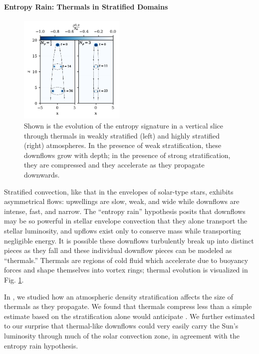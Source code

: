 \documentclass[preprint, hmargin=1in, vmargin=1in]{aastex62}
\begin{document}
\paragraph{Entropy Rain: Thermals in Stratified Domains}
\begin{figure}
	\begin{center}
	\vspace{-37pt}
    \includegraphics[width=0.45\textwidth]{./figs/evolution_colormeshes.pdf}
	\vspace{-16pt}
	\end{center}
    \caption{
	\citep[Fig.~2 of][]{andersLB2019} Shown is the evolution of the entropy signature in a vertical slice through thermals in weakly stratified (left) and highly stratified (right) atmospheres.
	In the presence of weak stratification, these downflows grow with depth; in the presence of strong stratification, they are compressed and they accelerate as they propagate downwards.
	\label{fig:thermals} }
	\vspace{-22pt}
\end{figure}

Stratified convection, like that in the envelopes of solar-type stars, exhibits asymmetrical flows: upwellings are slow, weak, and wide while downflows are intense, fast, and narrow.
The ``entropy rain'' hypothesis posits that downflows may be so powerful in stellar envelope convection that they alone transport the stellar luminosity, and upflows exist only to conserve mass while transporting negligible energy.
It is possible these downflows turbulently break up into distinct pieces as they fall and these individual downflow pieces can be modeled as ``thermals.''
Thermals are regions of cold fluid which accelerate due to buoyancy forces and shape themselves into vortex rings; thermal evolution is visualized in Fig. \ref{fig:thermals}.

In \citet{andersLB2019}, we studied how an atmospheric density stratification affects the size of thermals as they propagate.
We found that thermals compress less than a simple estimate based on the stratification alone would anticipate \citep{brandenburg2016}.
We further estimated to our surprise that thermal-like downflows could very easily carry the Sun's luminosity through much of the solar convection zone, in agreement with the entropy rain hypothesis.
\end{document}

